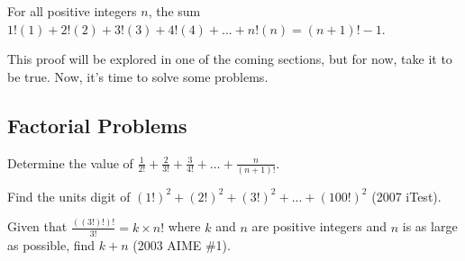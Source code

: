 \documentclass[11pt]{article}
\begin{document}
\begin{thrm}
	For all positive integers $n$, the sum $1!(1) + 2!(2) + 3!(3) + 4!(4) + ... + n!(n) = (n+1)! - 1$.
\end{thrm}
This proof will be explored in one of the coming sections, but for now, take it to be true. Now, it's time to solve some problems.

\subsection*{Factorial Problems}

\begin{problem}[15]
    Determine the value of $\frac{1}{2!} + \frac{2}{3!} + \frac{3}{4!} + \dots + \frac{n}{(n+1)!}.$
\end{problem}
\begin{problem}[20]
    Find the units digit of $(1!)^2 + (2!)^2 + (3!)^2 + ... + (100!)^2$ (2007 iTest).
\end{problem}
\begin{problem}[25]
    Given that $\frac{((3!)!)!}{3!} = k \times n!$ where $k$ and $n$ are positive integers and $n$ is as large as possible, find $k+n$ (2003 AIME \#1).
\end{problem}
\end{document}
